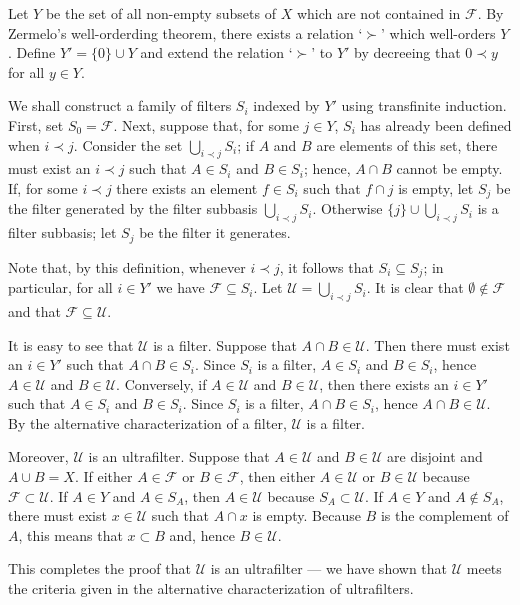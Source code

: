 \documentclass[12pt]{article}
\begin{document}
Let $Y$ be the set of all non-empty subsets of $X$ which are not contained in $\mathcal{F}$.  By Zermelo's well-orderding theorem, there exists a relation `$\succ$' which well-orders $Y$.  Define $Y' = \{0\} \cup Y$ and extend the relation `$\succ$' to $Y'$ by decreeing that $0 \prec y$ for all $y \in Y$.

We shall construct a family of filters $S_i$ indexed by $Y'$ using transfinite induction.  First, set $S_0 = \mathcal{F}$.  Next, suppose that, for some $j \in Y$, $S_i$ has already been defined when $i \prec j$.  Consider the set $\bigcup_{i \prec j} S_i$; if $A$ and $B$ are elements of this set, there must exist an $i \prec j$ such that $A \in S_i$ and $B \in S_i$; hence, $A \cap B$ cannot be empty.  If, for some $i \prec j$ there exists an element $f \in S_i$ such that $f \cap j$ is empty, let $S_j$ be the filter generated by the filter subbasis $\bigcup_{i \prec j} S_i$.  Otherwise $\{ j \} \cup \bigcup_{i \prec j} S_i$ is a filter subbasis; let $S_j$ be the filter it generates.

Note that, by this definition, whenever $i \prec j$, it follows that $S_i \subseteq S_j$; in particular, for all $i \in Y'$ we have $\mathcal{F} \subseteq S_i$.  Let $\mathcal{U} = \bigcup_{i \prec j} S_i$.  It is clear that $\emptyset \notin \mathcal{F}$ and that $\mathcal{F} \subseteq \mathcal{U}$.

It is easy to see that $\mathcal{U}$ is a filter.  Suppose that $A \cap B \in \mathcal{U}$.  Then there must exist an $i \in Y'$ such that $A \cap B \in S_i$.  Since $S_i$ is a filter, $A \in S_i$ and $B \in S_i$, hence $A \in \mathcal{U}$ and $B \in \mathcal{U}$.  Conversely, if $A \in \mathcal{U}$ and $B \in \mathcal{U}$, then there exists an $i \in Y'$ such that $A \in S_i$ and $B \in S_i$.  Since $S_i$ is a filter, $A \cap B \in S_i$, hence $A \cap B \in \mathcal{U}$.  By the alternative characterization of a filter, $\mathcal{U}$ is a filter.

Moreover, $\mathcal{U}$ is an ultrafilter.  Suppose that $A \in \mathcal{U}$ and $B \in \mathcal{U}$ are disjoint and $A \cup B = X$.  If either $A \in \mathcal{F}$ or $B \in \mathcal{F}$, then either $A \in \mathcal{U}$ or $B \in \mathcal{U}$ because $\mathcal{F} \subset \mathcal{U}$.  If $A \in Y$ and $A \in S_A$, then $A \in \mathcal{U}$ because $S_A \subset \mathcal{U}$.  If $A \in Y$ and $A \notin S_A$, there must exist $x \in \mathcal{U}$ such that $A \cap x$ is empty.  Because $B$ is the complement of $A$, this means that $x \subset B$ and, hence $B \in \mathcal{U}$.

This completes the proof that $\mathcal{U}$ is an ultrafilter --- we have shown that $\mathcal{U}$ meets the criteria given in the alternative characterization of ultrafilters.
\end{document}
